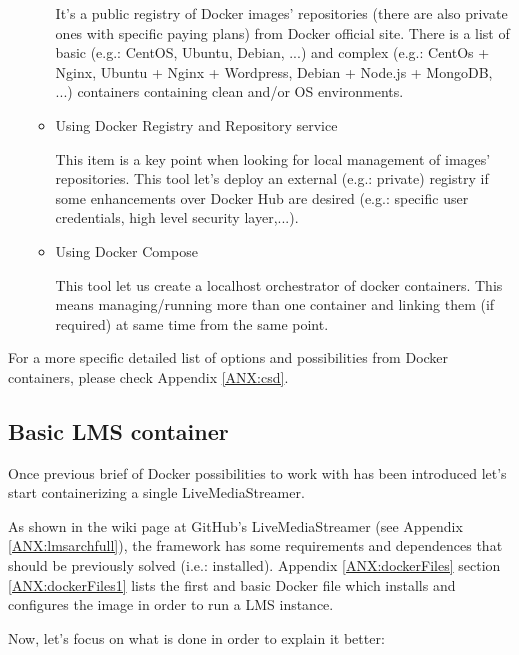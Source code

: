 \begin{itemize}
\begin{itemize}
	It's a public registry of Docker images' repositories (there are also private ones with specific paying plans) from Docker official site. There is a list of basic (e.g.: CentOS, Ubuntu, Debian, ...) and complex (e.g.: CentOs + Nginx, Ubuntu + Nginx + Wordpress, Debian + Node.js + MongoDB, ...) containers containing clean and/or OS environments. 
	
	\item Using Docker Registry and Repository service

	This item is a key point when looking for local management of images' repositories. This tool let's deploy an external (e.g.: private) registry if some enhancements over Docker Hub are desired (e.g.: specific user credentials, high level security layer,...).
	
	\item Using Docker Compose
	
	This tool let us create a localhost orchestrator of docker containers. This means managing/running more than one container and linking them (if required) at same time from the same point.
	
	\end{itemize}
\end{itemize}

For a more specific detailed list of options and possibilities from Docker containers, please check Appendix \ref{ANX:csd}.

\subsection{Basic LMS container}

Once previous brief of Docker possibilities to work with has been introduced let's start containerizing a single LiveMediaStreamer.

As shown in the wiki page at GitHub's LiveMediaStreamer (see Appendix \ref{ANX:lmsarchfull}), the framework has some requirements and dependences that should be previously solved (i.e.: installed). Appendix \ref{ANX:dockerFiles} section \ref{ANX:dockerFiles1} lists the first and basic Docker file which installs and configures the image in order to run a LMS instance. 

Now, let's focus on what is done in order to explain it better: 

